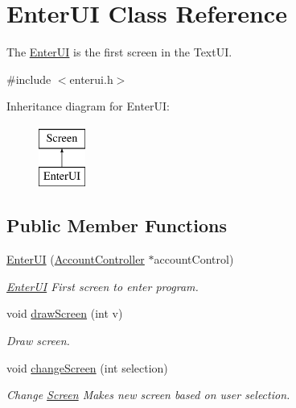 \hypertarget{classEnterUI}{}\section{Enter\+UI Class Reference}
\label{classEnterUI}


The \hyperlink{classEnterUI}{Enter\+UI} is the first screen in the Text\+UI.  




{\ttfamily \#include $<$enterui.\+h$>$}

Inheritance diagram for Enter\+UI\+:\begin{figure}[H]
\begin{center}
\leavevmode
\includegraphics[height=2.000000cm]{classEnterUI}
\end{center}
\end{figure}
\subsection*{Public Member Functions}
\begin{DoxyCompactItemize}
\item 
\hyperlink{classEnterUI_addf03135e8c0a153a42cfa08ff6aa3de}{Enter\+UI} (\hyperlink{classAccountController}{Account\+Controller} $\ast$account\+Control)
\begin{DoxyCompactList}\small\item\em \hyperlink{classEnterUI}{Enter\+UI} First screen to enter program. \end{DoxyCompactList}\item 
void \hyperlink{classEnterUI_a157f3cdd6607a46da895edcab4a5de04}{draw\+Screen} (int v)
\begin{DoxyCompactList}\small\item\em Draw screen. \end{DoxyCompactList}\item 
void \hyperlink{classEnterUI_a8808ce39b34f14b99669e9fad2149760}{change\+Screen} (int selection)
\begin{DoxyCompactList}\small\item\em Change \hyperlink{classScreen}{Screen} Makes new screen based on user selection. \end{DoxyCompactList}\end{DoxyCompactItemize}
